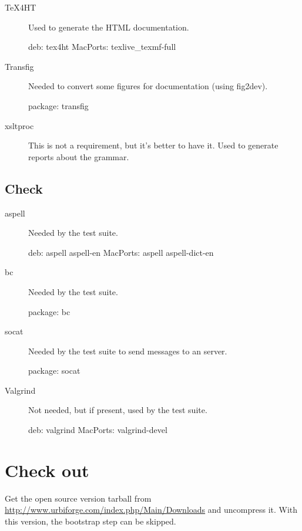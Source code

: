 \begin{description}
\item[TeX4HT] Used to generate the HTML documentation.
\begin{package}
deb: tex4ht
MacPorts: texlive_texmf-full
\end{package}

\item[Transfig] Needed to convert some figures for documentation
  (using fig2dev).
\begin{package}
package: transfig
\end{package}

\item[xsltproc] This is not a requirement, but it's better to have it. Used
  to generate reports about the \us grammar.
\end{description}

\subsection{Check}

\begin{description}
\item[aspell] Needed by the test suite.
\begin{package}
deb: aspell aspell-en
MacPorts: aspell aspell-dict-en
\end{package}

\item[bc]
  Needed by the test suite.
\begin{package}
package: bc
\end{package}

\item[socat] Needed by the test suite to send messages to an \urbi server.
\begin{package}
package: socat
\end{package}

\item[Valgrind] Not needed, but if present, used by the test suite.
\begin{package}
deb: valgrind
MacPorts: valgrind-devel
\end{package}

\end{description}



\section{Check out}

Get the open source version tarball from
\url{http://www.urbiforge.com/index.php/Main/Downloads} and uncompress it.
With this version, the bootstrap step can be skipped.

